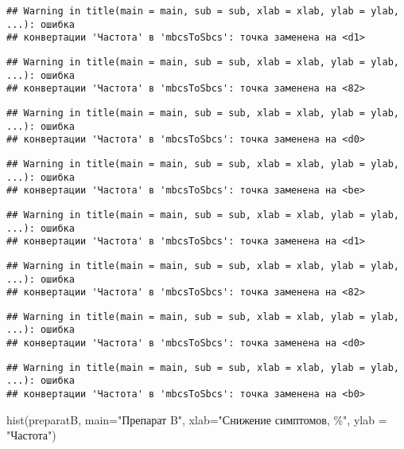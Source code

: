 \documentclass[
]{article}
\newenvironment{Shaded}{\begin{snugshade}}{\end{snugshade}}
\newcommand{\AttributeTok}[1]{\textcolor[rgb]{0.77,0.63,0.00}{#1}}
\newcommand{\FunctionTok}[1]{\textcolor[rgb]{0.00,0.00,0.00}{#1}}
\newcommand{\NormalTok}[1]{#1}
\newcommand{\StringTok}[1]{\textcolor[rgb]{0.31,0.60,0.02}{#1}}
\begin{document}
\begin{verbatim}
## Warning in title(main = main, sub = sub, xlab = xlab, ylab = ylab, ...): ошибка
## конвертации 'Частота' в 'mbcsToSbcs': точка заменена на <d1>
\end{verbatim}

\begin{verbatim}
## Warning in title(main = main, sub = sub, xlab = xlab, ylab = ylab, ...): ошибка
## конвертации 'Частота' в 'mbcsToSbcs': точка заменена на <82>
\end{verbatim}

\begin{verbatim}
## Warning in title(main = main, sub = sub, xlab = xlab, ylab = ylab, ...): ошибка
## конвертации 'Частота' в 'mbcsToSbcs': точка заменена на <d0>
\end{verbatim}

\begin{verbatim}
## Warning in title(main = main, sub = sub, xlab = xlab, ylab = ylab, ...): ошибка
## конвертации 'Частота' в 'mbcsToSbcs': точка заменена на <be>
\end{verbatim}

\begin{verbatim}
## Warning in title(main = main, sub = sub, xlab = xlab, ylab = ylab, ...): ошибка
## конвертации 'Частота' в 'mbcsToSbcs': точка заменена на <d1>
\end{verbatim}

\begin{verbatim}
## Warning in title(main = main, sub = sub, xlab = xlab, ylab = ylab, ...): ошибка
## конвертации 'Частота' в 'mbcsToSbcs': точка заменена на <82>
\end{verbatim}

\begin{verbatim}
## Warning in title(main = main, sub = sub, xlab = xlab, ylab = ylab, ...): ошибка
## конвертации 'Частота' в 'mbcsToSbcs': точка заменена на <d0>
\end{verbatim}

\begin{verbatim}
## Warning in title(main = main, sub = sub, xlab = xlab, ylab = ylab, ...): ошибка
## конвертации 'Частота' в 'mbcsToSbcs': точка заменена на <b0>
\end{verbatim}

\begin{Shaded}
\begin{Highlighting}[]
\FunctionTok{hist}\NormalTok{(preparatB, }\AttributeTok{main=}\StringTok{"Препарат B"}\NormalTok{, }\AttributeTok{xlab=}\StringTok{"Снижение симптомов, \%"}\NormalTok{, }\AttributeTok{ylab =} \StringTok{"Частота"}\NormalTok{)}
\end{Highlighting}
\end{Shaded}
\end{document}
